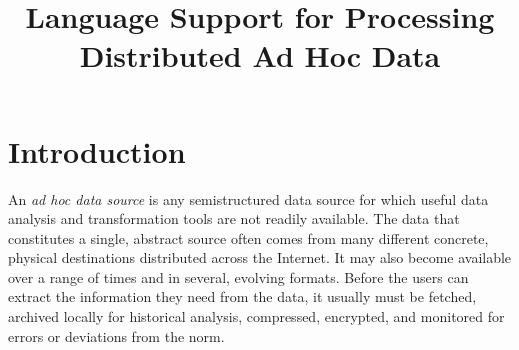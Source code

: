\documentclass[nocopyrightspace]{sigplanconf}
\begin{document}
\title{Language Support for Processing Distributed Ad Hoc Data}





\maketitle{}

\begin{abstract}  

\end{abstract}


\section {Introduction}
\label{sec:intro}

An {\em ad hoc data source} is any semistructured data source for
which useful data analysis and transformation tools are not readily
available.  The data that constitutes a single, abstract source 
often comes from many different concrete, physical destinations
distributed across the Internet.  It may also become available
over a range of times and in several, evolving formats.
Before the users can extract the information they need from the data,
it usually must be fetched, archived locally for historical analysis, 
compressed, encrypted, and monitored for errors or deviations from the norm.
\end{document}
